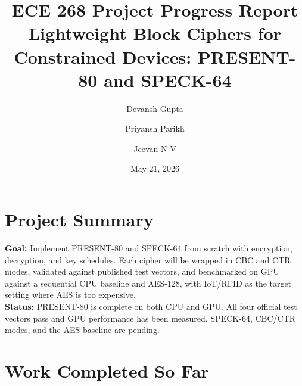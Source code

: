 \documentclass[10pt]{article}
\title{\vspace{-1.5em}ECE 268 Project Progress Report\\[0.2em]
\large Lightweight Block Ciphers for Constrained Devices: PRESENT-80 and SPECK-64}
\author{%
  Devansh Gupta \and
  Priyansh Parikh \and
  Jeevan N V
}
\date{May 21, 2026}
\begin{document}
\maketitle
\vspace{-1.2em}

\section*{Project Summary}
\textbf{Goal:} Implement PRESENT-80 and SPECK-64 from scratch with encryption, decryption,
and key schedules. Each cipher will be wrapped in CBC and CTR modes, validated against
published test vectors, and benchmarked on GPU against a sequential CPU baseline and
AES-128, with IoT/RFID as the target setting where AES is too expensive. \\
\textbf{Status:} PRESENT-80 is complete on both CPU and GPU. All four official test
vectors pass and GPU performance has been measured. SPECK-64, CBC/CTR modes, and the
AES baseline are pending.

\section{Work Completed So Far}
\end{document}
